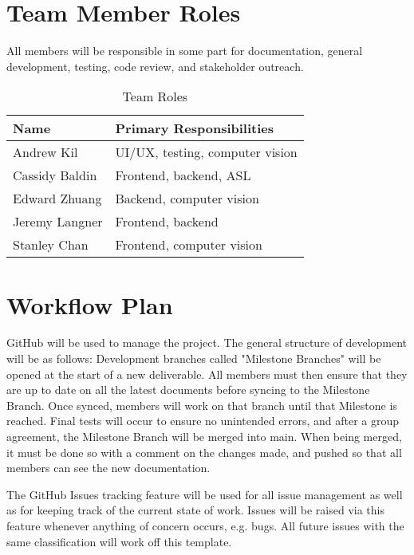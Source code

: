 \documentclass{article}
\begin{document}
\section{Team Member Roles}

All members will be responsible in some part for documentation, general development, testing, code review, and stakeholder outreach. 

\begin{table}%
\caption{Team Roles} \label{TblRoles}
\begin{tabularx}{\textwidth}{ll}
\toprule
\textbf{Name} & \textbf{Primary Responsibilities}\\
\midrule
Andrew Kil & UI/UX, testing, computer vision\\
Cassidy Baldin & Frontend, backend, ASL\\
Edward Zhuang & Backend, computer vision\\
Jeremy Langner & Frontend, backend\\
Stanley Chan & Frontend, computer vision\\
\bottomrule
\end{tabularx}
\end{table}

\section{Workflow Plan}

GitHub will be used to manage the project. The general structure of development will be as follows: Development branches called "Milestone Branches" will be opened at the start of a new deliverable. All members must then ensure that they are up to date on all the latest documents before syncing to the Milestone Branch. Once synced, members will work on that branch until that Milestone is reached. Final tests will occur to ensure no unintended errors, and after a group agreement, the Milestone Branch will be merged into main. When being merged, it must be done so with a comment on the changes made, and pushed so that all members can see the new documentation.

The GitHub Issues tracking feature will be used for all issue management as well as for keeping track of the current state of work. Issues will be raised via this feature whenever anything of concern occurs, e.g. bugs. All future issues with the same classification will work off this template.
\end{document}

